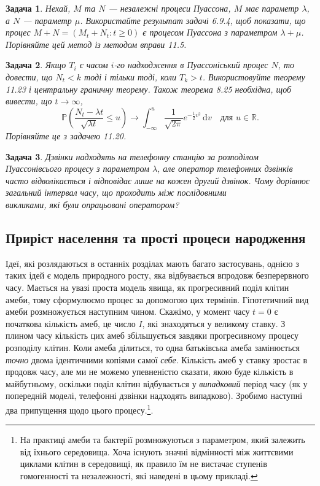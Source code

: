 \documentclass[12pt,fleqn]{article}
\newtheorem{problem}{Задача}[section]
\numberwithin{figure}{section}
\numberwithin{equation}{section}
\begin{document}
\begin{problem}
     Нехай, $M$ та $N$ --- незалежні процеси Пуассона, $M$ має параметр $\lambda$, а $N$ --- параметр $\mu$. Використайте результат задачі 6.9.4, щоб показати, що процес $M + N = (M_t + N_t : t \geq 0)$ є процесом Пуассона з параметром $\lambda + \mu$. Порівняйте цей метод із методом вправи 11.5.
\end{problem}

\begin{problem}
  Якщо $T_i$ є часом $i$-го надходження в Пуассоніський процес $N$, то довести, що $N_t < k$ тоді і тільки тоді, коли $T_k > t$. Використовуйте теорему 11.23 і центральну граничну теорему. Також теорема 8.25 необхідна, щоб вивести, що $t \rightarrow \infty$,
  $$ \mathbb{P}(\frac{N_t-\lambda t}{\sqrt{\lambda t}}\leq u)\rightarrow \int_{-\infty}^{u}\frac{1}{\sqrt{2\pi}}e^{-\frac{1}{2}v^2}\, \mathrm{d}v \quad \text{для $u \in \mathbb{R}.$} $$
  Порівняйте це з задачею 11.20.
\end{problem}

\begin{problem}
  Дзвінки надходять на телефонну станцію за розподілом Пуассонівсього процесу з параметром $\lambda$, але оператор телефонних дзвінків часто відволікається і відповідає лише на кожен другий дзвінок. Чому дорівнює загальний інтервал часу, що проходить між послідовними \\викликами, які були опрацьовані оператором?
\end{problem}

\subsection{Приріст населення та прості процеси народження}\label{11.4}
Ідеї, які розлядаються в останніх розділах мають багато застосувань, однією з таких ідей є модель природного росту, яка відбувається впродовж безперервного часу. Мається на увазі проста модель явища, як прогресивний поділ клітин амеби, тому сформулюємо процес за допомогою цих термінів. Гіпотетичний вид амеби розмножується наступним чином. Скажімо, у момент часу $t=0$ є початкова кількість амеб, це число $I$, які знаходяться у великому ставку. З плином часу кількість цих амеб збільшується завдяки прогресивному процесу розподілу клітин. Коли амеба ділиться, то одна батьківська амеба замінюється \emph{точно} двома ідентичними копіями самої \emph{себе}. Кількість амеб у ставку зростає в продовж часу, але ми не можемо упевненістю сказати, якою буде кількість в майбутньому, оскільки поділ клітин відбувається у \emph{випадковий} період часу (як у попередній моделі, телефонні дзвінки надходять випадково). Зробимо наступні два припущення щодо цього процесу.\footnote{На практиці амеби та бактерії розмножуються з параметром, який залежить від їхнього середовища. Хоча існують значні відмінності між життєвими циклами клітин в середовищі, як правило їм не вистачає ступенів гомогенності та незалежності, які наведені в цьому прикладі.}.
\end{document}
